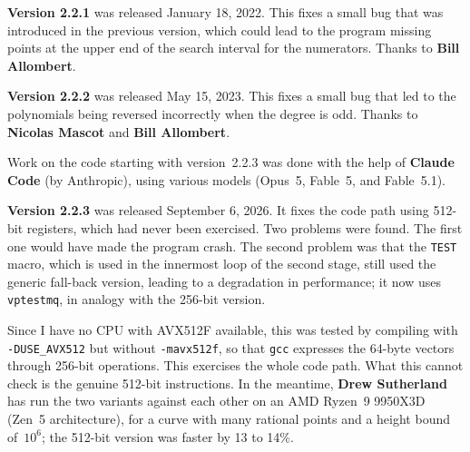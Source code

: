 \documentclass[12pt,a4paper,oneside]{amsart}
\begin{document}
\textbf{Version 2.2.1} was released January 18, 2022. This fixes a small
bug that was introduced in the previous version, which could lead to
the program missing points at the upper end of the search interval
for the numerators. Thanks to \textbf{Bill Allombert}.

\textbf{Version 2.2.2} was released May 15, 2023. This fixes a small
bug that led to the polynomials being reversed incorrectly when the
degree is odd. Thanks to \textbf{Nicolas Mascot} and \textbf{Bill Allombert}.

Work on the code starting with version~2.2.3 was done with the help
of \textbf{Claude Code} (by Anthropic), using various models
(Opus~5, Fable~5, and Fable~5.1).

\textbf{Version 2.2.3} was released September 6, 2026. It fixes the code
path using 512-bit registers, which had never been exercised. Two problems
were found. The first one would have made
the program crash. The second problem was that the \texttt{TEST} macro, which is
used in the innermost loop of the second stage, still used the generic
fall-back version, leading to a degradation in performance;
it now uses \texttt{vptestmq}, in analogy with the 256-bit version.

Since I have no CPU with AVX512F available, this was tested by compiling
with \verb+-DUSE_AVX512+ but without \verb+-mavx512f+, so that
\texttt{gcc} expresses the 64-byte vectors through 256-bit operations.
This exercises the whole code path. What this cannot check is the
genuine 512-bit instructions. In the meantime, \textbf{Drew Sutherland} has
run the two variants against each other on an AMD Ryzen~9 9950X3D (Zen~5
architecture), for a curve with many rational points and a height bound
of~$10^6$; the 512-bit version was faster by 13 to 14\%.
\end{document}
